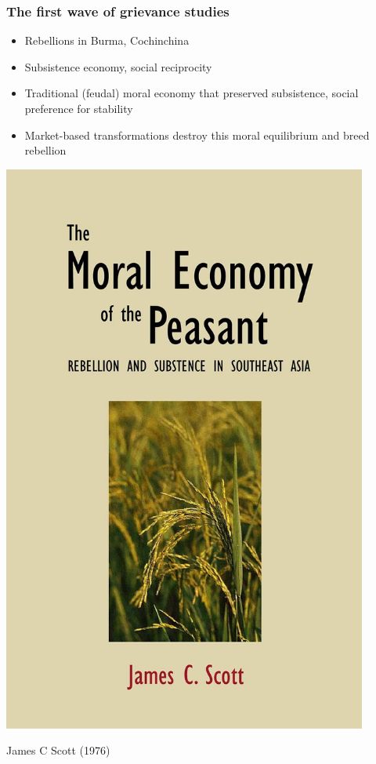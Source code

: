 \documentclass[aspectratio=43]{beamer}
\begin{document}
\begin{frame}
\frametitle{The first wave of grievance studies}
\centering

\begin{minipage}{0.59\textwidth}\centering
\begin{itemize}
  \item Rebellions in Burma, Cochinchina
  \item Subsistence economy, social reciprocity
  \item Traditional (feudal) moral economy that preserved subsistence, social preference for stability
  \item Market-based transformations destroy this moral equilibrium and breed rebellion
\end{itemize}
\end{minipage}\hfill
\begin{minipage}{0.4\textwidth}\centering
\includegraphics[width = 0.9\textwidth]{img/scott_moral}

James C Scott (1976)
\end{minipage}

\end{frame}
\end{document}

